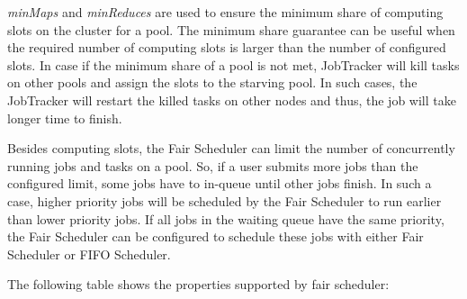 \emph{minMaps} and \emph{minReduces} are used to ensure the minimum share of computing slots on the cluster for a pool. The minimum share guarantee can be useful when the required number of computing slots is larger than the number of configured slots. In case if the minimum share of a pool is not met, JobTracker will kill tasks on other pools and assign the slots to the starving pool. In such cases, the JobTracker will restart the killed tasks on other nodes and thus, the job will take longer time to finish.

Besides computing slots, the Fair Scheduler can limit the number of concurrently running jobs and tasks on a pool. So, if a user submits more jobs than the configured limit, some jobs have to in-queue until other jobs finish. In such a case, higher priority jobs will be scheduled by the Fair Scheduler to run earlier than lower priority jobs. If all jobs in the waiting queue have the same priority, the Fair Scheduler can be configured to schedule these jobs with either Fair Scheduler or FIFO Scheduler.

The following table shows the properties supported by fair scheduler:

